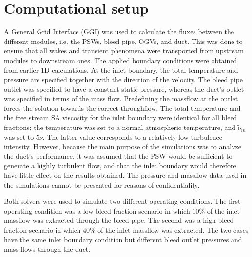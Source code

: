 \section{Computational setup}
A General Grid Interface (GGI) was used to calculate the fluxes between the different modules, i.e. the PSWs, bleed pipe, OGVs, and duct. This was done to ensure that all wakes and transient phenomena were transported from upstream modules to downstream ones. The applied boundary conditions were obtained from earlier 1D calculations. At the inlet boundary, the total temperature and pressure are specified together with the direction of the velocity. The bleed pipe outlet was specified to have a constant static pressure, whereas the duct's outlet was specified in terms of the mass flow. Predefining the massflow at the outlet forces the solution towards the correct throughflow. The total temperature and the free stream SA viscosity for the inlet boundary were identical for all bleed fractions; the temperature was set to a normal atmospheric temperature, and $\tilde{\nu}_{in}$ was set to $5\nu$. The latter value corresponds to a relatively low turbulence intensity. However, because the main purpose of the simulations was to analyze the duct’s performance, it was assumed that the PSW would be sufficient to generate a highly turbulent flow, and that the inlet boundary would therefore have little effect on the results obtained. The pressure and massflow data used in the simulations cannot be presented for reasons of confidentiality.

Both solvers were used to simulate two different operating conditions. The first operating condition was a low bleed fraction scenario in which $10\%$ of the inlet massflow was extracted through the bleed pipe. The second was a high bleed fraction scenario in which $40\%$ of the inlet massflow was extracted. The two cases have the same inlet boundary condition but different bleed outlet pressures and mass flows through the duct. 

